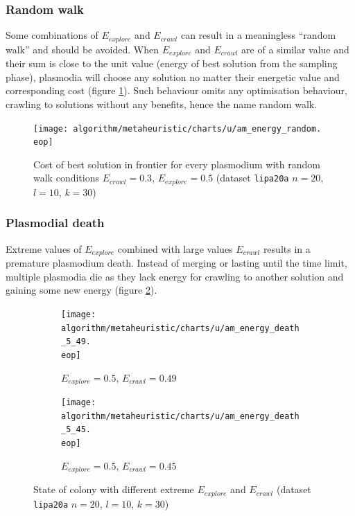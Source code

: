 \documentclass[english,a4paper,twoside]{ppfcmthesis}
\begin{document}
\subsubsection{Random walk}

Some combinations of $E_{explore}$ and $E_{crawl}$ can result in a meaningless ``random walk'' and should be avoided. When $E_{explore}$ and $E_{crawl}$ are of a similar value and their sum is close to the unit value (energy of best solution from the sampling phase), plasmodia will choose any solution no matter their energetic value and corresponding cost (figure \ref{figure:am_energy_random}). Such behaviour omits any optimisation behaviour, crawling to solutions without any benefits, hence the name random walk.

\begin{figure}
  \centering

  \texttt{[image: algorithm/metaheuristic/charts/u/am\_energy\_random.\\eop]}

  \caption{Cost of best solution in frontier for every plasmodium with random walk conditions $E_{crawl}=0.3$, $E_{explore}=0.5$ (dataset \texttt{lipa20a} $n=20$, $l=10$, $k=30$)}
  \label{figure:am_energy_random}
\end{figure}

\subsubsection{Plasmodial death}

Extreme values of $E_{explore}$ combined with large values $E_{crawl}$ results in a premature plasmodium death. Instead of merging or lasting until the time limit, multiple plasmodia die as they lack energy for crawling to another solution and gaining some new energy (figure \ref{figure:am_energy_death}).

\begin{figure}
  \centering

  \begin{subfigure}{\textwidth}
    \texttt{[image: algorithm/metaheuristic/charts/u/am\_energy\_death\_5\_49.\\eop]}
    \caption{$E_{explore}=0.5$, $E_{crawl}=0.49$}
  \end{subfigure}
  \par\bigskip
  \begin{subfigure}{\textwidth}
    \texttt{[image: algorithm/metaheuristic/charts/u/am\_energy\_death\_5\_45.\\eop]}
    \caption{$E_{explore}=0.5$, $E_{crawl}=0.45$}
  \end{subfigure}

  \caption{State of colony with different extreme $E_{explore}$ and $E_{crawl}$ (dataset \texttt{lipa20a} $n=20$, $l=10$, $k=30$)}
  \label{figure:am_energy_death}
\end{figure}
\end{document}
